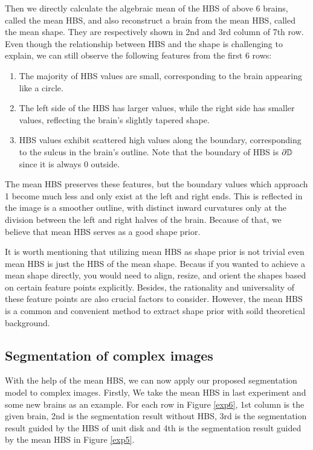 \documentclass[review,onefignum,onetabnum]{siamonline190516}
\begin{document}
Then we directly calculate the algebraic mean of the HBS of above 6 brains, called the mean HBS, and also reconstruct a brain from the mean HBS, called the mean shape. They are respectively shown in 2nd and 3rd column of 7th row. Even though the relationship between HBS and the shape is challenging to explain, we can still observe the following features from the first 6 rows:
\begin{enumerate}
    \item The majority of HBS values are small, corresponding to the brain appearing like a circle.
    \item The left side of the HBS has larger values, while the right side has smaller values, reflecting the brain's slightly tapered shape.
    \item HBS values exhibit scattered high values along the boundary, corresponding to the sulcus in the brain's outline. Note that the boundary of HBS is $\partial \mathbb{D}$ since it is always $0$ outside.
\end{enumerate}
The mean HBS preserves these features, but the boundary values which approach 1 become much less and only exist at the left and right ends. This is reflected in the image is a smoother outline, with distinct inward curvatures only at the division between the left and right halves of the brain. Because of that, we believe that mean HBS serves as a good shape prior.

It is worth mentioning that utilizing mean HBS as shape prior is not trivial even mean HBS is just the HBS of the mean shape. Becaus if you wanted to achieve a mean shape directly, you would need to align, resize, and orient the shapes based on certain feature points explicitly. Besides, the rationality and universality of these feature points are also crucial factors to consider. However, the mean HBS is a common and convenient method to extract shape prior with soild theoretical background.

\subsection{Segmentation of complex images}
With the help of the mean HBS, we can now apply our proposed segmentation model to complex images. Firstly, We take the mean HBS in last experiment and some new brains as an example. For each row in Figure \ref{exp6}, 1st column is the given brain, 2nd is the segmentation result without HBS, 3rd is the segmentation result guided by the HBS of unit disk and 4th is the segmentation result guided by the mean HBS in Figure \ref{exp5}.
\end{document}
